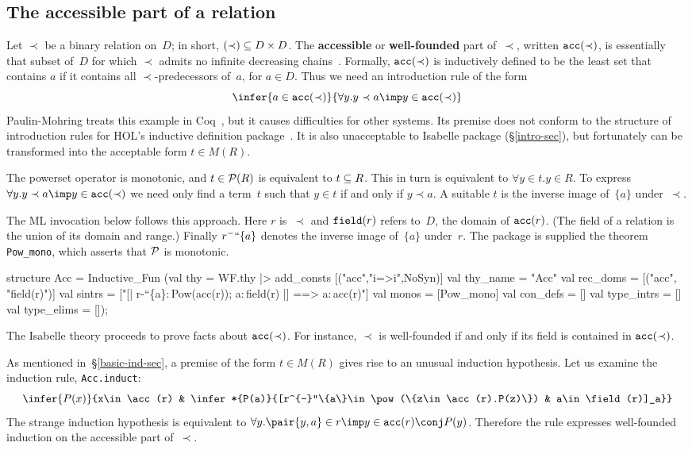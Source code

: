 \subsection{The accessible part of a relation}\label{acc-sec}
Let $\prec$ be a binary relation on~$D$; in short, $(\prec)\subseteq D\times D$.
The {\bf accessible} or {\bf well-founded} part of~$\prec$, written
$\hbox{\tt acc}(\prec)$, is essentially that subset of~$D$ for which $\prec$ admits
no infinite decreasing chains~\cite{aczel77}.  Formally, $\hbox{\tt acc}(\prec)$ is
inductively defined to be the least set that contains $a$ if it contains
all $\prec$-predecessors of~$a$, for $a\in D$.  Thus we need an
introduction rule of the form 
\[ \infer{a\in\acc(\prec)}{\forall y.y\prec a\imp y\in\acc(\prec)} \]
Paulin-Mohring treats this example in Coq~\cite{paulin92}, but it causes
difficulties for other systems.  Its premise does not conform to 
the structure of introduction rules for HOL's inductive definition
package~\cite{camilleri92}.  It is also unacceptable to Isabelle package
(\S\ref{intro-sec}), but fortunately can be transformed into the acceptable
form $t\in M(R)$.

The powerset operator is monotonic, and $t\in{\cal P}(R)$ is equivalent to
$t\subseteq R$.  This in turn is equivalent to $\forall y\in t. y\in R$.  To
express $\forall y.y\prec a\imp y\in\acc(\prec)$ we need only find a
term~$t$ such that $y\in t$ if and only if $y\prec a$.  A suitable $t$ is
the inverse image of~$\{a\}$ under~$\prec$.

The ML invocation below follows this approach.  Here $r$ is~$\prec$ and
$\hbox{\tt field}(r)$ refers to~$D$, the domain of $\hbox{\tt acc}(r)$.  (The field of a
relation is the union of its domain and range.)  Finally
$r^{-}``\{a\}$ denotes the inverse image of~$\{a\}$ under~$r$.  The package is
supplied the theorem {\tt Pow\_mono}, which asserts that ${\cal P}$ is monotonic.
\begin{ttbox}
structure Acc = Inductive_Fun
 (val thy        = WF.thy |> add_consts [("acc","i=>i",NoSyn)]
  val thy_name   = "Acc"
  val rec_doms   = [("acc", "field(r)")]
  val sintrs     = ["[| r-``\{a\}:\,Pow(acc(r)); a:\,field(r) |] ==> a:\,acc(r)"]
  val monos      = [Pow_mono]
  val con_defs   = []
  val type_intrs = []
  val type_elims = []);
\end{ttbox}
The Isabelle theory proceeds to prove facts about $\hbox{\tt acc}(\prec)$.  For
instance, $\prec$ is well-founded if and only if its field is contained in
$\hbox{\tt acc}(\prec)$.  

As mentioned in~\S\ref{basic-ind-sec}, a premise of the form $t\in M(R)$
gives rise to an unusual induction hypothesis.  Let us examine the
induction rule, {\tt Acc.induct}:
\[ \infer{P(x)}{x\in\acc(r) &
     \infer*{P(a)}{[r^{-}``\{a\}\in\pow(\{z\in\acc(r).P(z)\}) & 
                   a\in\field(r)]_a}}
\]
The strange induction hypothesis is equivalent to
$\forall y. \pair{y,a}\in r\imp y\in\acc(r)\conj P(y)$.
Therefore the rule expresses well-founded induction on the accessible part
of~$\prec$.

